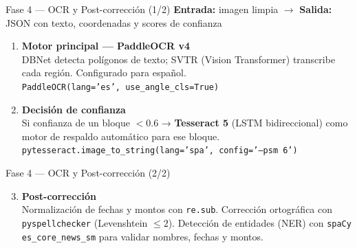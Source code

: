 \documentclass[aspectratio=169, 11pt]{beamer}
\newcommand{\lib}[1]{\texttt{\small\color{AccBlue}#1}}
\newcommand{\rojo}[1]{\textcolor{PriRed}{#1}}
\begin{document}
\begin{frame}{Fase 4 — OCR y Post-corrección (1/2)}
  \textbf{Entrada:} imagen limpia \quad $\rightarrow$ \quad
  \textbf{Salida:} JSON con texto, coordenadas y scores de confianza
  \vspace{10pt}
  \begin{enumerate}[label=\textbf{\rojo{\arabic*.}}, leftmargin=1.8em, itemsep=10pt]
    \item \textbf{Motor principal — PaddleOCR v4}\\
      DBNet detecta polígonos de texto; SVTR (Vision Transformer) transcribe cada región. Configurado para español.\\
      \lib{PaddleOCR(lang='es', use\_angle\_cls=True)}
    \item \textbf{Decisión de confianza}\\
      Si confianza de un bloque $< 0.6$ → \textbf{Tesseract 5} (LSTM bidireccional) como motor de respaldo automático para ese bloque.\\
      \lib{pytesseract.image\_to\_string(lang='spa', config='--psm 6')}
  \end{enumerate}
\end{frame}

\begin{frame}{Fase 4 — OCR y Post-corrección (2/2)}
  \begin{enumerate}[label=\textbf{\rojo{\arabic*.}}, leftmargin=1.8em, itemsep=10pt]
    \setcounter{enumi}{2}
    \item \textbf{Post-corrección}\\
      Normalización de fechas y montos con \lib{re.sub}. Corrección ortográfica con \lib{pyspellchecker} (Levenshtein $\leq 2$). Detección de entidades (NER) con \lib{spaCy es\_core\_news\_sm} para validar nombres, fechas y montos.
  \end{enumerate}
\end{frame}
\end{document}
